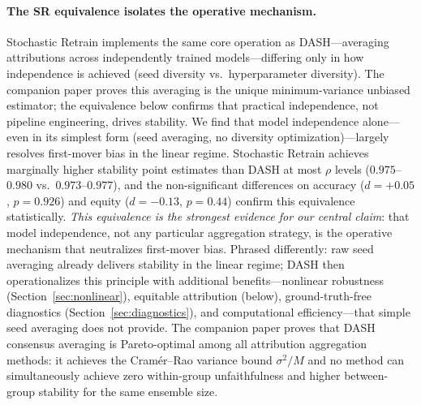 \documentclass[11pt]{article}
\newcommand{\dash}{\textsc{DASH}}
\newcommand{\rhovar}{\rho}
\begin{document}
\paragraph{The SR equivalence isolates the operative mechanism.}
Stochastic Retrain implements the same core operation as
\dash{}---averaging attributions across independently trained
models---differing only in how independence is achieved (seed diversity
vs.\ hyperparameter diversity).  The companion paper
\citep{caraker2026impossibility} proves this averaging is the unique
minimum-variance unbiased estimator; the equivalence below confirms
that practical independence, not pipeline engineering, drives stability.
We find that model independence alone---even in its simplest form (seed
averaging, no diversity optimization)---largely resolves first-mover
bias in the linear regime.  Stochastic Retrain achieves marginally
higher stability point estimates than \dash{} at most $\rhovar$ levels
($0.975$--$0.980$ vs.\ $0.973$--$0.977$), and the non-significant
differences on accuracy ($d = +0.05$, $p = 0.926$) and equity
($d = -0.13$, $p = 0.44$) confirm this equivalence statistically.
\emph{This equivalence is the strongest evidence for our central claim}:
that model independence, not any particular aggregation strategy, is the
operative mechanism that neutralizes first-mover bias.  Phrased differently:
raw seed averaging already delivers stability in the linear regime;
\dash{} then operationalizes this principle with additional
benefits---nonlinear robustness (Section~\ref{sec:nonlinear}), equitable
attribution (below), ground-truth-free diagnostics
(Section~\ref{sec:diagnostics}), and computational efficiency---that
simple seed averaging does not provide.
The companion paper \citep{caraker2026impossibility} proves that
\dash{} consensus averaging is Pareto-optimal among all attribution
aggregation methods: it achieves the Cram\'er--Rao variance bound
$\sigma^2/M$ and no method can simultaneously achieve zero
within-group unfaithfulness and higher between-group stability for the
same ensemble size.
\end{document}
